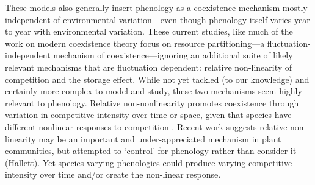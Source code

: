 \documentclass[11pt]{article}
\begin{document}
These models also generally insert phenology as a coexistence mechanism mostly independent of environmental variation---even though phenology itself varies year to year with environmental variation. These current studies, like much of the work on modern coexistence theory focus on resource partitioning---a fluctuation-independent mechanism of coexistence---ignoring an additional suite of likely relevant mechanisms that are fluctuation dependent: relative non-linearity of competition and the storage effect. While not yet tackled (to our knowledge) and certainly more complex to model and study, these two mechanisms seem highly relevant to phenology. Relative non-nonlinearity promotes coexistence through variation in competitive intensity over time or space, given that species have different nonlinear responses to competition \citep{CHESSON:1994vn,Chesson:2000vd}. Recent work suggests relative non-linearity may be an important and under-appreciated mechanism in plant communities, but attempted to `control' for phenology rather than consider it (Hallett). Yet species varying phenologies could produce varying competitive intensity over time and/or create the non-linear response. 
\end{document}
